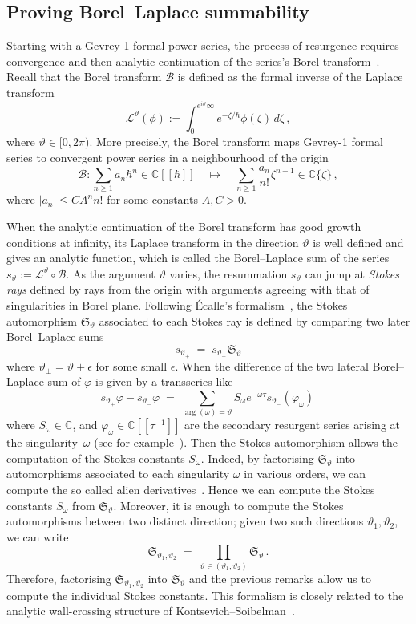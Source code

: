 \documentclass[12pt,reqno]{amsart}
\theoremstyle{definition}
\def\BC{\mathbb C}
\def\calB{\mathcal B}
\def\calL{\mathcal L}
\def\be{\begin{equation}}
\def\ee{\end{equation}}
\def\z{\zeta}
\renewcommand{\=}{\;=\;}
\begin{document}
\subsection{Proving Borel--Laplace summability}\label{sec:BL-intro}
Starting with a Gevrey-1 formal power series, the process of resurgence requires convergence and then analytic continuation of the series's Borel transform~\cite{EcalleI,diverg-resurg-i}. 
%
Recall that the Borel transform $\calB$ is defined as the formal inverse of the Laplace transform
\be\label{eq:laplace}
\calL^\vartheta(\phi):=\int_0^{e^{i\vartheta}\infty} e^{-\z/\hbar} \phi(\z) \, d\z\,,
\ee
where $\vartheta\in [0,2\pi)$. 
More precisely, the Borel transform maps Gevrey-1 formal series to convergent power series in a neighbourhood of the origin 
\be\label{eq:borel}
\calB\colon\sum_{n\geq 1} a_n \hbar^n\in\BC[\![\hbar]\!]\quad\mapsto\quad \sum_{n\geq 1} \frac{a_n}{n!} \zeta^{n-1}\in\BC\{\zeta\}\,,
\ee 
where $|a_n|\leq C A^n n!$ for some constants $A,C>0$.

When the analytic continuation of the Borel transform has good growth conditions at infinity, its Laplace transform in the direction $\vartheta$ is well defined and gives an analytic function, which is called the Borel--Laplace sum of the series $s_\vartheta:=\calL^\vartheta\circ\calB$. As the argument $\vartheta$ varies, the resummation $s_\vartheta$ can jump at {\em Stokes rays} defined by rays from the origin with arguments agreeing with that of singularities in Borel plane. 
Following \'Ecalle's formalism~\cite{EcalleI,diverg-resurg-i}, the Stokes automorphism $\mathfrak{S}_{\vartheta}$ associated to each Stokes ray is defined by comparing two later Borel--Laplace sums  
\be
s_{\vartheta_+}\=s_{\vartheta_-}\mathfrak{S}_{\vartheta}
\ee
where $\vartheta_\pm=\vartheta\pm\epsilon$ for some small $\epsilon$. When the difference of the two lateral Borel--Laplace sum of $\varphi$ is given by a transseries like 
\be
s_{\vartheta_+}\varphi-s_{\vartheta_-}\varphi\=\sum_{\arg(\omega)=\vartheta} S_\omega e^{-\omega\tau}s_{\vartheta_-}(\varphi_\omega)\,
\ee
where $S_\omega\in\BC$, and $\varphi_\omega\in\BC[\![\tau^{-1}]\!]$ are the secondary resurgent series arising at the singularity~$\omega$ (see for example~\cite[Sec.~5]{GGM:I}). Then the Stokes automorphism allows the computation of the Stokes constants $S_\omega$. Indeed, by factorising $\mathfrak{S}_{\vartheta}$ into automorphisms associated to each singularity $\omega$ in various orders, we can compute the so called alien derivatives~\cite[Def.~6.63]{diverg-resurg-i}. Hence we can compute the Stokes constants $S_\omega$ from $\mathfrak{S}_\vartheta$.  
Moreover, it is enough to compute the Stokes automorphisms between two distinct direction; given two such directions $\vartheta_1, \vartheta_2$, we can write
\be
  \mathfrak{S}_{\vartheta_1,\vartheta_2}
  \=
  \prod_{\vartheta\in(\vartheta_1,\vartheta_2)}\mathfrak{S}_{\vartheta}\,.
\ee
Therefore, factorising $\mathfrak{S}_{\vartheta_1,\vartheta_2}$ into $\mathfrak{S}_{\vartheta}$ and the previous remarks allow us to compute the individual Stokes constants. This formalism is closely related to the analytic wall-crossing structure of Kontsevich--Soibelman~\cite{kontsevich2022analyticity}.
\end{document}
